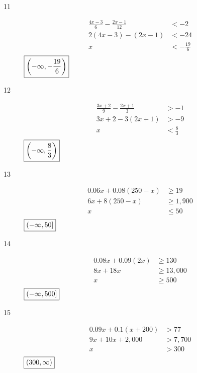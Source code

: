 \documentclass[letterpaper]{exam}
\begin{document}
\begin{description}
      \item[11]
        \begin{align*}
          \frac{4x - 3}{6} - \frac{2x - 1}{12} & < -2 \\
          2 (4x - 3) - (2x - 1)                & < -24 \\
          x                                    & < - \frac{19}{6} \\
        \end{align*}
        $\boxed{ \intoo{ -\infty, - \frac{19}{6} } }$

      \item[12]
        \begin{align*}
          \frac{3x + 2}{9} - \frac{2x + 1}{3} & > -1 \\
          3x + 2 - 3(2x + 1)                  & > -9 \\
          x                                   & < \frac{8}{3} \\
        \end{align*}
        $\boxed{ \intoo{ -\infty, \frac{8}{3} } }$

      \item[13]
        \begin{align*}
          0.06x + 0.08 (250 - x) & \geq 19 \\
          6x + 8(250 - x)        & \geq 1,900 \\
          x                      & \leq 50 \\
        \end{align*}
        $\boxed{ \intoc{ -\infty, 50 } }$

      \item[14]
        \begin{align*}
          0.08x + 0.09 (2x) & \geq 130 \\
          8x + 18x          & \geq 13,000 \\
          x                 & \geq 500 \\
        \end{align*}
        $\boxed{ \intoc{ -\infty, 500 } }$

      \item[15]
        \begin{align*}
          0.09x + 0.1 (x + 200) & > 77 \\
          9x + 10x + 2,000      & > 7,700 \\
          x                     & > 300 \\
        \end{align*}
        $\boxed{ \intoo{ 300, \infty } }$


\end{description}
\end{document}
